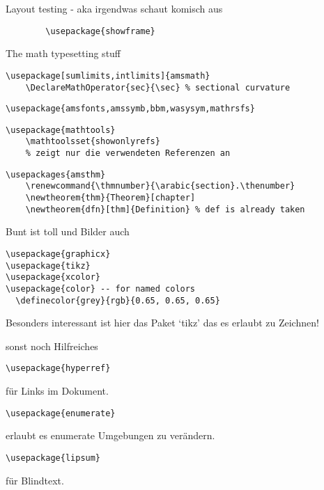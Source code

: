 \documentclass{beamer}
\begin{document}
\begin{frame}[fragile]{Layout testing - aka irgendwas schaut komisch aus}
    \begin{verbatim}
        \usepackage{showframe}
    \end{verbatim}
\end{frame}

\begin{frame}[fragile]{The math typesetting stuff}
    \footnotesize
\begin{verbatim}
\usepackage[sumlimits,intlimits]{amsmath}
    \DeclareMathOperator{sec}{\sec} % sectional curvature
\end{verbatim}
\pause
\begin{verbatim}
\usepackage{amsfonts,amssymb,bbm,wasysym,mathrsfs}
\end{verbatim}
\pause
\begin{verbatim}
\usepackage{mathtools}
    \mathtoolsset{showonlyrefs}
    % zeigt nur die verwendeten Referenzen an
\end{verbatim}
\pause
\begin{verbatim}
\usepackages{amsthm}
    \renewcommand{\thmnumber}{\arabic{section}.\thenumber}
    \newtheorem{thm}{Theorem}[chapter]
    \newtheorem{dfn}[thm]{Definition} % def is already taken
\end{verbatim}
\end{frame}

\begin{frame}[fragile]{Bunt ist toll und Bilder auch}
\begin{verbatim}
\usepackage{graphicx}
\usepackage{tikz}
\usepackage{xcolor}
\usepackage{color} -- for named colors
  \definecolor{grey}{rgb}{0.65, 0.65, 0.65}
\end{verbatim}
Besonders interessant ist hier das Paket ‘tikz’ das es erlaubt zu Zeichnen!
\end{frame}

\begin{frame}[fragile]{sonst noch Hilfreiches}
    \begin{verbatim}
\usepackage{hyperref}
    \end{verbatim}
    für Links im Dokument.
    \pause
    \begin{verbatim}
\usepackage{enumerate}
    \end{verbatim}
    erlaubt es enumerate Umgebungen zu verändern.
    \pause
    \begin{verbatim}
\usepackage{lipsum}
    \end{verbatim}
    für Blindtext.
\end{frame}
\end{document}

